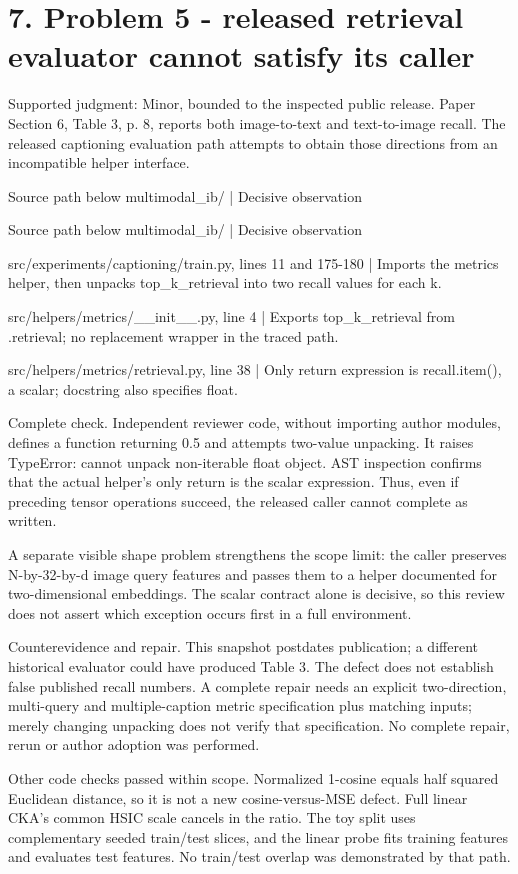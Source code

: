 \documentclass[10pt]{article}
\begin{document}
\section*{7. Problem 5 - released retrieval evaluator cannot satisfy its caller}
Supported judgment: Minor, bounded to the inspected public release. Paper Section 6, Table 3, p. 8, reports both image-to-text and text-to-image recall. The released captioning evaluation path attempts to obtain those directions from an incompatible helper interface.\par
Source path below multimodal\_ib/ | Decisive observation\par
Source path below multimodal\_ib/ | Decisive observation\par
src/experiments/captioning/train.py, lines 11 and 175-180 | Imports the metrics helper, then unpacks top\_k\_retrieval into two recall values for each k.\par
src/helpers/metrics/\_\_init\_\_.py, line 4 | Exports top\_k\_retrieval from .retrieval; no replacement wrapper in the traced path.\par
src/helpers/metrics/retrieval.py, line 38 | Only return expression is recall.item(), a scalar; docstring also specifies float.\par
Complete check. Independent reviewer code, without importing author modules, defines a function returning 0.5 and attempts two-value unpacking. It raises TypeError: cannot unpack non-iterable float object. AST inspection confirms that the actual helper’s only return is the scalar expression. Thus, even if preceding tensor operations succeed, the released caller cannot complete as written.\par
A separate visible shape problem strengthens the scope limit: the caller preserves N-by-32-by-d image query features and passes them to a helper documented for two-dimensional embeddings. The scalar contract alone is decisive, so this review does not assert which exception occurs first in a full environment.\par
Counterevidence and repair. This snapshot postdates publication; a different historical evaluator could have produced Table 3. The defect does not establish false published recall numbers. A complete repair needs an explicit two-direction, multi-query and multiple-caption metric specification plus matching inputs; merely changing unpacking does not verify that specification. No complete repair, rerun or author adoption was performed.\par
Other code checks passed within scope. Normalized 1-cosine equals half squared Euclidean distance, so it is not a new cosine-versus-MSE defect. Full linear CKA’s common HSIC scale cancels in the ratio. The toy split uses complementary seeded train/test slices, and the linear probe fits training features and evaluates test features. No train/test overlap was demonstrated by that path.\par
\end{document}
